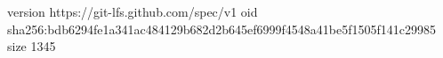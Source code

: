 version https://git-lfs.github.com/spec/v1
oid sha256:bdb6294fe1a341ac484129b682d2b645ef6999f4548a41be5f1505f141c29985
size 1345
